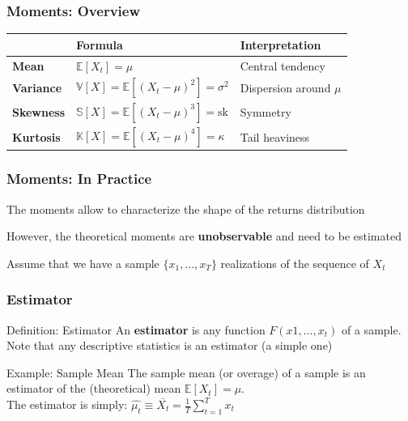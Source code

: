 \documentclass{beamer}
\newenvironment{wideitemize}{\itemize\addtolength{\itemsep}{10pt}}{\enditemize}
\begin{document}
\begin{frame}
  \frametitle{Moments: Overview}
  \begin{table}
    \centering
    \begin{tabular}{lll}
      \hline
      \hline
      & Formula & Interpretation \\
      \hline
      \textbf{Mean} & $\mathbb{E}[X_t] = \mu$ & Central tendency\\
      \textbf{Variance} & $\mathbb{V}[X] = \mathbb{E}\left[(X_t - \mu)^2\right] = \sigma^2$ & Dispersion around $\mu$\\
      \textbf{Skewness} & $\mathbb{S}[X] = \mathbb{E}\left[(X_t - \mu)^3\right] = \text{sk}$ & Symmetry\\
      \textbf{Kurtosis} & $\mathbb{K}[X] = \mathbb{E}\left[(X_t - \mu)^4\right] = \kappa$ & Tail heaviness\\
      \hline
      \hline                                                                                            
    \end{tabular}
  \end{table}
\end{frame}



\begin{frame}
  \frametitle{Moments: In Practice}

  \begin{wideitemize}
    \item The moments allow to characterize the shape of the returns distribution
    \item However, the theoretical moments are \textbf{unobservable} and need to be estimated
    \item Assume that we have a sample $\{x_1, \dots, x_T\}$ realizations of the sequence of $X_t$
  \end{wideitemize}
  
\end{frame}



\begin{frame}
  \frametitle{Estimator}

  \begin{block}{Definition: Estimator}
    An \textbf{estimator} is any function $F(x1, \dots, x_t)$ of a sample. Note that any descriptive statistics is an estimator (a simple one) 
  \end{block}


  \begin{exampleblock}{Example: Sample Mean}
    The sample mean (or overage) of a sample is an estimator of the (theoretical) mean $ \mathbb{E}[X_t] = \mu$.\\
    The estimator is simply: $\hat{\mu_t} \equiv \bar{X_t} = \frac{1}{T} \sum_{t=1}^{T}x_t$
  \end{exampleblock}
  
\end{frame}
\end{document}

